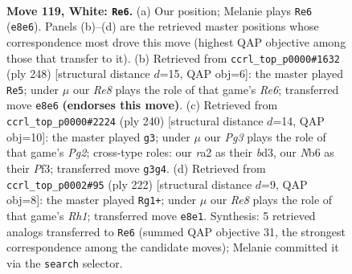 \documentclass[11pt]{article}
\begin{document}
\clearpage

\begin{figure}[p]\centering
\begin{subfigure}{0.46\textwidth}\centering
\resizebox{\linewidth}{!}{%
\newchessgame
\chessboard[
  setfen={4R3/6pk/1N3p2/7p/7P/6PK/r7/8 w - - 62 119},
  showmover=false,
  pgfstyle=straightmove, color=movearrow, markmove={e8-e6}
]}
\caption{}
\end{subfigure}\hfill
\begin{subfigure}{0.46\textwidth}\centering
\resizebox{\linewidth}{!}{%
\newchessgame
\chessboard[
  setfen={8/6k1/4R3/5p1p/5P1P/6PK/1r6/8 w - - 95 125},
  showmover=false,
  pgfstyle=straightmove, color=movearrow, markmove={e6-e5}
]}
\caption{}
\end{subfigure}
\\[4pt]
\begin{subfigure}{0.46\textwidth}\centering
\resizebox{\linewidth}{!}{%
\newchessgame
\chessboard[
  setfen={8/5k2/5p2/2B3p1/7p/3b1P1P/6PK/8 w - - 0 121},
  showmover=false,
  pgfstyle=straightmove, color=movearrow, markmove={g2-g3}
]}
\caption{}
\end{subfigure}\hfill
\begin{subfigure}{0.46\textwidth}\centering
\resizebox{\linewidth}{!}{%
\newchessgame
\chessboard[
  setfen={6k1/5p2/4pP2/4P3/4PK2/r7/8/7R w - - 39 112},
  showmover=false,
  pgfstyle=straightmove, color=movearrow, markmove={h1-g1}
]}
\caption{}
\end{subfigure}
\caption{\textbf{Move 119, White: \texttt{Re6}.} (a) Our position; Melanie plays \texttt{Re6} (\texttt{e8e6}). Panels (b)--(d) are the retrieved master positions whose correspondence most drove this move (highest QAP objective among those that transfer to it). (b) Retrieved from \texttt{ccrl\_top\_p0000\#1632} (ply 248) [structural distance $d$=15, QAP obj=6]: the master played \texttt{Re5}; under $\mu$ our \emph{Re8} plays the role of that game's \emph{Re6}; transferred move \texttt{e8e6} \textbf{(endorses this move)}. (c) Retrieved from \texttt{ccrl\_top\_p0000\#2224} (ply 240) [structural distance $d$=14, QAP obj=10]: the master played \texttt{g3}; under $\mu$ our \emph{Pg3} plays the role of that game's \emph{Pg2}; cross-type roles: our \emph{r}a2 as their \emph{b}d3, our \emph{N}b6 as their \emph{P}f3; transferred move \texttt{g3g4}. (d) Retrieved from \texttt{ccrl\_top\_p0002\#95} (ply 222) [structural distance $d$=9, QAP obj=8]: the master played \texttt{Rg1+}; under $\mu$ our \emph{Re8} plays the role of that game's \emph{Rh1}; transferred move \texttt{e8e1}. Synthesis: 5 retrieved analogs transferred to \texttt{Re6} (summed QAP objective 31, the strongest correspondence among the candidate moves); Melanie committed it via the \texttt{search} selector.}
\label{fig:thought-m236}
\end{figure}
\end{document}
